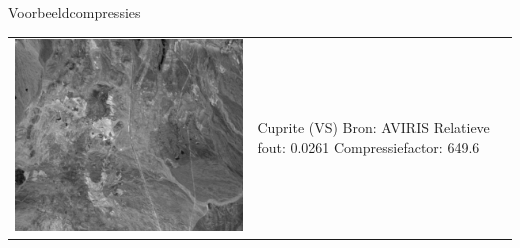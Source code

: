 \documentclass[t,12pt,dutch
\ifx\beamermode\undefined\else,\beamermode\fi
]{beamer}
\begin{document}
\begin{frame}{Voorbeeldcompressies}

\begin{table}[H]
\centering
\begin{tabular}{C{0.6\textwidth}  L{0.4\textwidth}}
\includegraphics[width=\linewidth]{images/example_compression_Cuprite_0_025.png}
&
Cuprite (VS)\newline
Bron: AVIRIS\newline
\vspace{5mm}
Relatieve fout: 0.0261
Compressiefactor: 649.6
\end{tabular}
\end{table}

\end{frame}
\end{document}
